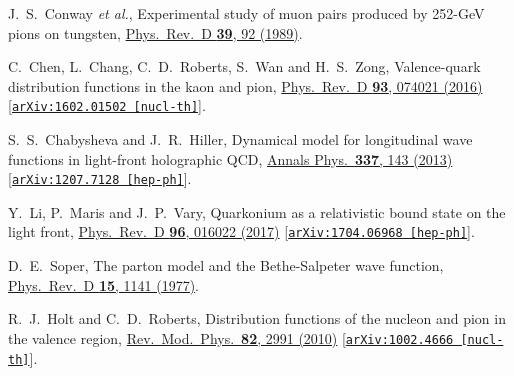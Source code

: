 \documentclass[aps,prl,reprint,groupedaddress, preprintnumbers]{revtex4-1}
\begin{document}
\begin{thebibliography}{50}
  J.~S.~Conway {\it et al.},
  Experimental study of muon pairs produced by 252-GeV pions on tungsten,
  \href{https://doi.org/10.1103/PhysRevD.39.92}{Phys.\ Rev.\ D {\bf 39}, 92 (1989)}.
  
 
  C.~Chen, L.~Chang, C.~D.~Roberts, S.~Wan and H.~S.~Zong,
  Valence-quark distribution functions in the kaon and pion,
  \href{https://doi.org/10.1103/PhysRevD.93.074021}{Phys.\ Rev.\ D {\bf 93},  074021 (2016)}
  [\href{https://arxiv.org/abs/1602.01502}{\tt arXiv:1602.01502 [nucl-th]}].  
  
  
  S.~S.~Chabysheva and J.~R.~Hiller,
  Dynamical model for longitudinal wave functions in light-front holographic QCD,
  \href{https://www.sciencedirect.com/science/article/pii/S0003491613001486?via%3Dihub}{Annals Phys.\  {\bf 337}, 143 (2013)}
  [\href{https://arxiv.org/abs/1207.7128}{\tt arXiv:1207.7128 [hep-ph]}].
  
  
  Y.~Li, P.~Maris and J.~P.~Vary,
  Quarkonium as a relativistic bound state on the light front,
  \href{https://journals.aps.org/prd/abstract/10.1103/PhysRevD.96.016022}{Phys.\ Rev.\ D {\bf 96}, 016022 (2017)}
  [\href{https://arxiv.org/abs/1704.06968}{\tt arXiv:1704.06968 [hep-ph]}].
  
  
  D.~E.~Soper,
  The parton model and the Bethe-Salpeter wave function,
  \href{https://doi.org/10.1103/PhysRevD.15.1141}{ Phys.\ Rev.\ D {\bf 15}, 1141 (1977)}.  
 
   
  R.~J.~Holt and C.~D.~Roberts,
  Distribution functions of the nucleon and pion in the valence region,
  \href{https://doi.org/10.1103/RevModPhys.82.2991}{Rev.\ Mod.\ Phys.\  {\bf 82}, 2991 (2010)}
  [\href{https://arxiv.org/abs/1002.4666}{\tt arXiv:1002.4666 [nucl-th]}].
  



\end{thebibliography}
\end{document}
